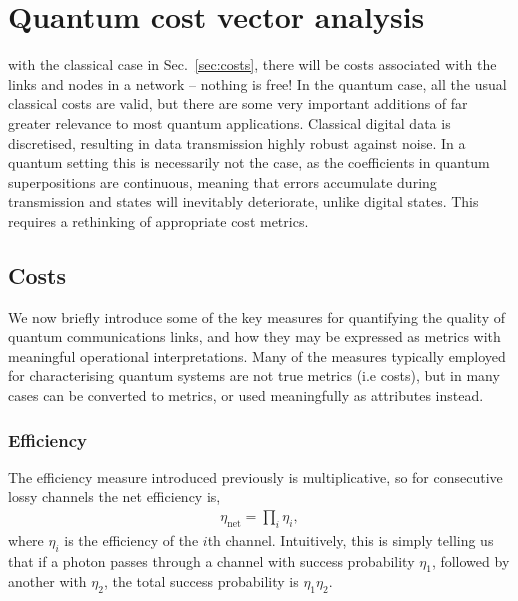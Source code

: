 %
%

\section{Quantum cost vector analysis} \label{sec:quantum_meas_cost}

 with the classical case in Sec.~\ref{sec:costs}, there will be costs associated with the links and nodes in a network -- nothing is free! In the quantum case, all the usual classical costs are valid, but there are some very important additions of far greater relevance to most quantum applications. Classical digital data is discretised, resulting in data transmission highly robust against noise. In a quantum setting this is necessarily not the case, as the coefficients in quantum superpositions are continuous, meaning that errors accumulate during transmission and states will inevitably deteriorate, unlike digital states. This requires a rethinking of appropriate cost metrics.

%
%

\subsection{Costs}

We now briefly introduce some of the key measures for quantifying the quality of quantum communications links, and how they may be expressed as metrics with meaningful operational interpretations. Many of the measures typically employed for characterising quantum systems are not true metrics (i.e costs), but in many cases can be converted to metrics, or used meaningfully as attributes instead.

%
%

\subsubsection{Efficiency} 

The efficiency measure introduced previously is multiplicative, so for consecutive lossy channels the net efficiency is,
\begin{align}
\eta_\mathrm{net}=\prod_i \eta_i,
\end{align}
where $\eta_i$ is the efficiency of the $i$th channel. Intuitively, this is simply telling us that if a photon passes through a channel with success probability $\eta_1$, followed by another with $\eta_2$, the total success probability is \mbox{$\eta_1\eta_2$}.

